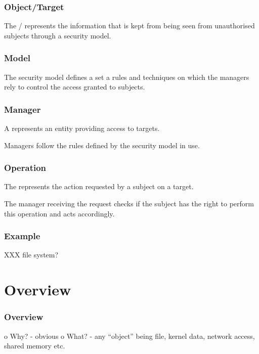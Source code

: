 
\begin{frame}
  \frametitle{Object/Target}

  The / represents the information that is kept
  from being seen from unauthorised subjects through a security model.
\end{frame}


\begin{frame}
  \frametitle{Model}

  The security model defines a set a rules and techniques on which the
  managers rely to control the access granted to subjects.
\end{frame}


\begin{frame}
  \frametitle{Manager}

  A  represents an entity providing access to targets.

  \-

  Managers follow the rules defined by the security model in use.
\end{frame}


\begin{frame}
  \frametitle{Operation}

  The  represents the action requested by a subject on
  a target.

  \-

  The manager receiving the request checks if the subject has the right
  to perform this operation and acts accordingly.
\end{frame}


\begin{frame}
  \frametitle{Example}

  XXX file system?
\end{frame}

%
%

\section{Overview}


\begin{frame}
  \frametitle{Overview}

  o Why?
    - obvious
  o What?
    - any ``object'' being file, kernel data, network access, shared memory etc.
\end{frame}

